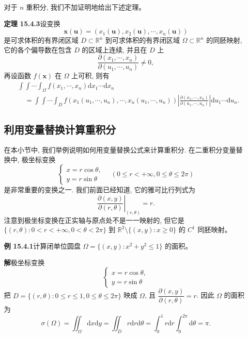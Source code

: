 \documentclass[UTF8, 12pt, fontset=fandol, oneside]{ctexart}
\begin{document}
对于 $n$ 重积分, 我们不加证明地给出下述定理。

\noindent\textbf{定理 15.4.3}\quad 设变换
\[
  \boldsymbol x(\boldsymbol u)=(x_1(\boldsymbol u),x_2(\boldsymbol u),\cdots,x_n(\boldsymbol u))
\]
是可求体积的有界闭区域 $D\subset\mathbb R^n$ 到可求体积的有界闭区域 $\Omega\subset\mathbb R^n$ 的同胚映射, 它的各个偏导数在包含 $D$ 的区域上连续, 并且在 $D$ 上
\[
  \frac{\partial(x_1,\cdots,x_n)}{\partial(u_1,\cdots,u_n)}\ne0,
\]
再设函数 $f(\boldsymbol x)$ 在 $\Omega$ 上可积, 则有
\[
\begin{aligned}
  &\int\!\!\int\cdots\int_\Omega f(x_1,\cdots,x_n)\mathrm dx_1\cdots\mathrm dx_n\\
  &\quad=\int\!\!\int\cdots\int_D
  f(x_1(u_1,\cdots,u_n),\cdots,x_n(u_1,\cdots,u_n))
  \left|\frac{\partial(x_1,\cdots,x_n)}{\partial(u_1,\cdots,u_n)}\right|
  \mathrm du_1\cdots\mathrm du_n.
\end{aligned}
\]

\subsection{利用变量替换计算重积分}

在本小节中, 我们举例说明如何用变量替换公式来计算重积分. 在二重积分变量替换中, 极坐标变换
\[
  \begin{cases}
    x=r\cos\theta,\\
    y=r\sin\theta
  \end{cases}
  \quad(0\leqslant r<+\infty,0\leqslant\theta\leqslant2\pi)
\]
是非常重要的变换之一. 我们前面已经知道, 它的雅可比行列式为
\[
  \left.\frac{\partial(x,y)}{\partial(r,\theta)}\right|_{(r,\theta)}=r.
\]
注意到极坐标变换在正实轴与原点处不是一一映射的, 但它是 $\{(r,\theta):0<r<+\infty,0<\theta<2\pi\}$ 到 $\mathbb R^2\setminus\{(x,y):x\geqslant0\}$ 的 $C^1$ 同胚映射。

\noindent\textbf{例 15.4.1}\quad 计算闭单位圆盘 $\Omega=\{(x,y):x^2+y^2\leqslant1\}$ 的面积。

\noindent\textbf{解}\quad 极坐标变换
\[
  \begin{cases}
    x=r\cos\theta,\\
    y=r\sin\theta
  \end{cases}
\]
把 $D=\{(r,\theta):0\leqslant r\leqslant1,0\leqslant\theta\leqslant2\pi\}$ 映成 $\Omega$, 且 $\dfrac{\partial(x,y)}{\partial(r,\theta)}=r$. 因此 $\Omega$ 的面积为
\[
  \sigma(\Omega)=\iint_\Omega\mathrm dx\mathrm dy
  =\iint_D r\mathrm dr\mathrm d\theta
  =\int_0^1 r\mathrm dr\int_0^{2\pi}\mathrm d\theta=\pi.
\]
\end{document}

